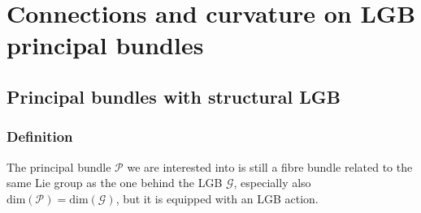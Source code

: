 \documentclass[a4paper,oneside,11pt,bibliography=totoc]{scrartcl}
\theoremstyle{plain}
\theoremstyle{remark}
\theoremstyle{definition}
\begin{document}
\section{Connections and curvature on LGB principal bundles}

\subsection{Principal bundles with structural LGB}

\subsubsection{Definition}

The principal bundle $\mathcal{P}$ we are interested into is still a fibre bundle related to the same Lie group as the one behind the LGB $\mathcal{G}$, especially also $\mathrm{dim}(\mathcal{P}) = \mathrm{dim}(\mathcal{G})$, but it is equipped with an LGB action.
\end{document}
